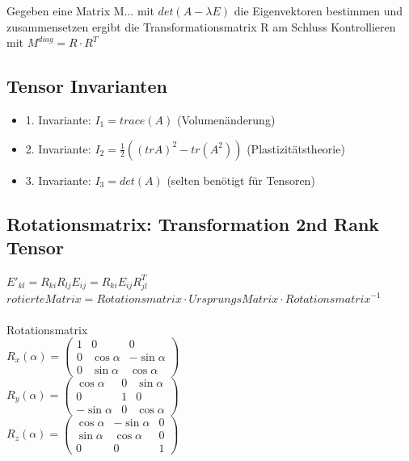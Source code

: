 \documentclass[a4paper]{scrartcl}
\begin{document}
Gegeben eine Matrix M... mit $det(A-\lambda E)$ die Eigenvektoren bestimmen und zusammensetzen ergibt die Transformationsmatrix R am Schluss Kontrollieren mit $M^{diag}=R \cdot R^T$

\subsection{Tensor Invarianten}
\begin{itemize}
  \item 1. Invariante: $I_1 = trace(A)$ (Volumenänderung)
  \item 2. Invariante: $I_2 = \frac{1}{2} ((tr A)^2 - tr(A^2))$
  (Plastizitätstheorie)
  \item 3. Invariante: $I_3 = det(A)$ (selten benötigt für Tensoren)
\end{itemize}

\subsection{Rotationsmatrix: Transformation 2nd Rank Tensor}
$E'_{kl}=R_{ki}R_{lj}E_{ij}=R_{ki}E_{ij}R_{jl}^T$\\
$rotierteMatrix = Rotationsmatrix \cdot UrsprungsMatrix \cdot
Rotationsmatrix^{-1}$
\\
\\
Rotationsmatrix
\\
$R_x(\alpha) = \begin{pmatrix} 
1 &   0         & 0           \\
0 & \cos \alpha & -\sin \alpha \\
0 & \sin \alpha &  \cos \alpha
\end{pmatrix} $
\\
$R_y(\alpha) = \begin{pmatrix} 
\cos \alpha  & 0 & \sin \alpha \\
   0         & 1 &  0          \\
-\sin \alpha & 0 & \cos \alpha
\end{pmatrix} $
\\
$R_z(\alpha) = \begin{pmatrix} 
\cos \alpha & -\sin \alpha & 0 \\
\sin \alpha &  \cos \alpha & 0 \\            
   0        &  0           & 1
\end{pmatrix}$
\\
\end{document}
